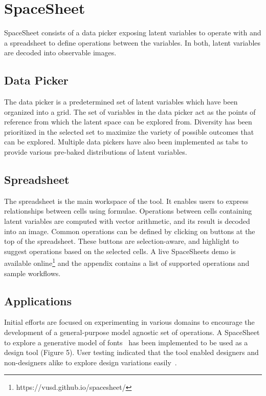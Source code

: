 \documentclass[letterpaper]{article}
\begin{document}
\section{SpaceSheet}

SpaceSheet consists of a data picker exposing latent variables to operate with and a spreadsheet to define operations between the variables. In both, latent variables are decoded into observable images.

\subsection{Data Picker}

The data picker is a predetermined set of latent variables which have been organized into a grid. The set of variables in the data picker act as the points of reference from which the latent space can be explored from. Diversity has been prioritized in the selected set to maximize the variety of possible outcomes that can be explored. Multiple data pickers have also been implemented as tabs to provide various pre-baked distributions of latent variables.

\subsection{Spreadsheet}

The spreadsheet is the main workspace of the tool. It enables users to express relationships between cells using formulae. Operations between cells containing latent variables are computed with vector arithmetic, and its result is decoded into an image. Common operations can be defined by clicking on buttons at the top of the spreadsheet. These buttons are selection-aware, and highlight to suggest operations based on the selected cells. A live SpaceSheets demo is available online\footnote{https://vusd.github.io/spacesheet/} and the appendix contains a list of supported operations and sample workflows.

\subsection{Applications}

Initial efforts are focused on experimenting in various domains to encourage the development of a general-purpose model agnostic set of operations. A SpaceSheet to explore a generative model of fonts~\cite{bernhardsson15} has been implemented to be used as a design tool (Figure 5). User testing indicated that the tool enabled designers and non-designers alike to explore design variations easily~\cite{loh18}.
\end{document}
